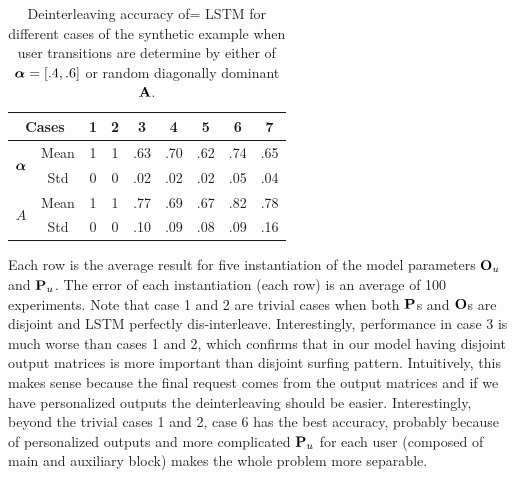 	\begin{table}
		\scriptsize  
		\centering
		\begin{tabular}{|c|c|c|c|c|c|c|c|c|}
			\hline
			\multicolumn{2}{|c|}{\bf \footnotesize Cases} & {\bf \footnotesize  1} & {\bf \footnotesize  2} & {\bf \footnotesize  3} & {\bf \footnotesize  4} & {\bf \footnotesize  5} & {\bf \footnotesize 6} & {\bf \footnotesize  7}  \\ 
			\hline  
			\multirow{2}{*}{$\aalpha$} & {\footnotesize  Mean} 	&  1 	& 1		&  .63 &  .70 & .62 &  .74& .65 \\ \cline{2-9}
			                           & {\footnotesize  Std} 	&  0 	& 0 	&  .02 &  .02 & .02 &  .05& .04 \\ \hline 
			\hline  
			\multirow{2}{*}{$A$}       & {\footnotesize  Mean} 	&  1 	& 1		&  .77 & .69 &  .67 & .82 & .78 \\ \cline{2-9}
			                           & {\footnotesize  Std} 	&  0 	& 0		&  .10 & .09 &  .08 & .09 & .16 \\ \hline 
		\end{tabular}
		\caption{Deinterleaving accuracy of= LSTM for different cases of the synthetic example when user transitions are determine by either of $\aalpha = [.4, .6]$ or random diagonally dominant $\A$.}
		\label{tab:as}
	\end{table}
	
	Each row is the average result for five instantiation of the model parameters $\O_u$ and $\P_u$. 
	The error of each instantiation (each row) is an average of 100 experiments. 
	Note that case 1 and 2 are trivial cases when both $\P$s and $\O$s are disjoint and LSTM perfectly dis-interleave. 
	Interestingly, performance in case 3 is much worse than cases 1 and 2, which confirms that in our model having disjoint output matrices is more important than disjoint surfing pattern. 
	Intuitively, this makes sense because the final request comes from the output matrices and if we have personalized outputs the deinterleaving should be easier. 
	Interestingly, beyond the trivial cases 1 and 2, case 6 has the best accuracy, probably because of personalized outputs and more complicated $\P_u$ for each user (composed of main and auxiliary block) makes the whole problem more separable. 
	
	
